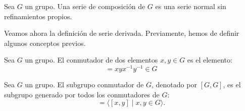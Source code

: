 \begin{ejercicio}
    \begin{definicion}
        Sea \(G\) un grupo. Una serie de composición de \(G\) es una serie normal sin refinamientos propios.
    \end{definicion}

    \begin{comment}
    Además, presenta una importante caracterización, para lo que hemos de definir el concepto de subgrupo simple.
    \begin{definicion}[Subgrupo simple]
        Un grupo \(G\) se dice \emph{simple} si no tiene subgrupos normales propios.
    \end{definicion}
    \begin{prop}[Caracterización de serie de composición]
        Sea \(G\) un grupo. Entonces, una serie normal de \(G\) es una serie de composición si y solo si todos sus factores son grupos simples.
    \end{prop}
    \end{comment}

    Veamos ahora la definición de serie derivada. Previamente, hemos de definir algunos conceptos previos.
    \begin{definicion}[Conmutador]
        Sea \(G\) un grupo. El conmutador de dos elementos \(x, y \in G\) es el elemento:
        \begin{equation*}
            [x, y] = xyx^{-1}y^{-1}\in G
        \end{equation*}
    \end{definicion}
    \begin{definicion}
        Sea \(G\) un grupo. El subgrupo conmutador de \(G\), denotado por \([G, G]\), es el subgrupo generado por todos los conmutadores de \(G\):
        \begin{equation*}
            [G, G] = \langle [x, y] \mid x, y \in G\rangle.
        \end{equation*}
    \end{definicion}



\end{ejercicio}
